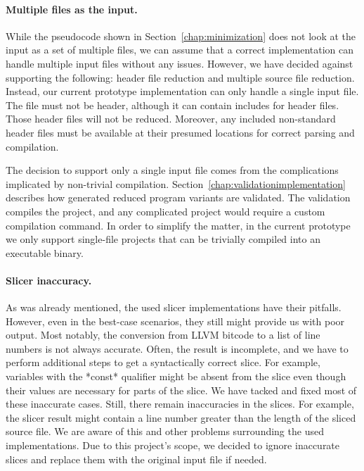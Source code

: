 \paragraph{Multiple files as the input.}
While the pseudocode shown in Section~\ref{chap:minimization} does not look 
at the input as a set of multiple files, we can assume that a correct 
implementation can handle multiple input files without any issues. 
However, we have decided against supporting the following: header file 
reduction and multiple source file reduction. 
Instead, our current prototype implementation can only handle a single input
file.
The file must not be header, although it can contain includes for header 
files. 
Those header files will not be reduced. 
Moreover, any included non-standard header files must be available at their 
presumed locations for correct parsing and compilation.

The decision to support only a single input file comes from 
the complications implicated by non-trivial compilation. 
Section~\ref{chap:validationimplementation} describes how generated reduced 
program variants are validated. 
The validation compiles the project, and any complicated project would 
require a custom compilation command. 
In order to simplify the matter, in the current prototype we only support 
single-file projects that can be trivially compiled into an executable 
binary.

\paragraph{Slicer inaccuracy.}
As was already mentioned, the used slicer implementations have their 
pitfalls. 
However, even in the best-case scenarios, they still might provide us with 
poor output. 
Most notably, the conversion from LLVM bitcode to a list of line numbers is 
not always accurate. 
Often, the result is incomplete, and we have to perform additional steps to 
get a syntactically correct slice. 
For example, variables with the *const* qualifier might be absent from 
the slice even though their values are necessary for parts of the slice. 
We have tacked and fixed most of these inaccurate cases. 
Still, there remain inaccuracies in the slices. 
For example, the slicer result might contain a line number greater than 
the length of the sliced source file. 
We are aware of this and other problems surrounding the used implementations. 
Due to this project's scope, we decided to ignore inaccurate slices and 
replace them with the original input file if needed.


